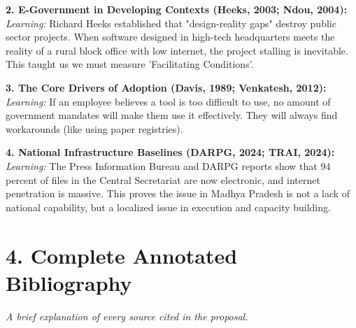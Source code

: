 \documentclass[11pt,a4paper]{article}
\begin{document}
\textbf{2. E-Government in Developing Contexts (Heeks, 2003; Ndou, 2004):} \\
\textit{Learning:} Richard Heeks established that "design-reality gaps" destroy public sector projects. When software designed in high-tech headquarters meets the reality of a rural block office with low internet, the project stalling is inevitable. This taught us we must measure 'Facilitating Conditions'.

\textbf{3. The Core Drivers of Adoption (Davis, 1989; Venkatesh, 2012):} \\
\textit{Learning:} If an employee believes a tool is too difficult to use, no amount of government mandates will make them use it effectively. They will always find workarounds (like using paper registries).

\textbf{4. National Infrastructure Baselines (DARPG, 2024; TRAI, 2024):} \\
\textit{Learning:} The Press Information Bureau and DARPG reports show that 94 percent of files in the Central Secretariat are now electronic, and internet penetration is massive. This proves the issue in Madhya Pradesh is not a lack of national capability, but a localized issue in execution and capacity building.

\vspace{0.5cm}

\section*{4. Complete Annotated Bibliography}
\textit{A brief explanation of every source cited in the proposal.}
\end{document}
